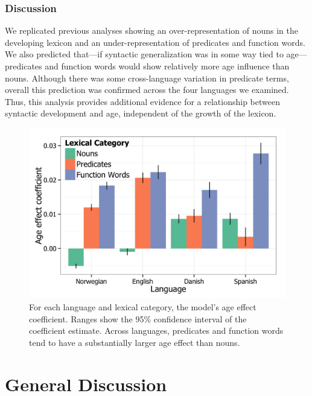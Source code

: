 \documentclass[10pt,letterpaper]{article}
\begin{document}
\subsubsection{Discussion}

We replicated previous analyses \cite{bates1994} showing an over-representation of nouns in the developing lexicon and an under-representation of predicates and function words. We also predicted that---if syntactic generalization was in some way tied to age---predicates and function words would show relatively more age influence than nouns. Although there was some cross-language variation in predicate terms, overall this prediction was confirmed across the four languages we examined. Thus, this analysis provides additional evidence for a relationship between syntactic development and age, independent of the growth of the lexicon.

\begin{figure}[tb]
\centering
\includegraphics[width=\linewidth]{plots/coefs_vocab_comp.png}
\caption{\label{fig:coefs_vocab_comp} For each language and lexical category, the model's age effect coefficient. Ranges show the 95\% confidence interval of the coefficient estimate. Across languages, predicates and function words tend to have a substantially larger age effect than nouns.}
\end{figure}

\section{General Discussion}
\end{document}
